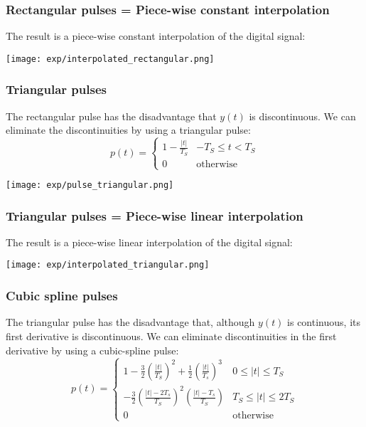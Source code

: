 \documentclass{beamer}
\begin{document}
\begin{frame}
  \frametitle{Rectangular pulses = Piece-wise constant interpolation}

  The result is a  piece-wise constant interpolation of the digital signal:

  \centerline{\texttt{[image: exp/interpolated\_rectangular.png]}}  
\end{frame}

\begin{frame}
  \frametitle{Triangular pulses}

  The rectangular pulse has the disadvantage that $y(t)$ is discontinuous.
  We can eliminate the discontinuities by using a triangular pulse:
  \begin{displaymath}
    p(t) = \begin{cases}
      1-\frac{|t|}{T_S} & -T_S\le t<T_S\\
      0 & \mbox{otherwise}
    \end{cases}
  \end{displaymath}

  \centerline{\texttt{[image: exp/pulse\_triangular.png]}}  
\end{frame}

\begin{frame}
  \frametitle{Triangular pulses = Piece-wise linear interpolation}

  The result is a  piece-wise linear interpolation of the digital signal:

  \centerline{\texttt{[image: exp/interpolated\_triangular.png]}}  
\end{frame}

\begin{frame}
  \frametitle{Cubic spline pulses}

  The triangular pulse has the disadvantage that, although $y(t)$ is continuous, its
  first derivative is discontinuous.  We can eliminate discontinuities in the first derivative
  by using a cubic-spline pulse:
  \begin{displaymath}
    p(t) = \begin{cases}
      1-\frac{3}{2}\left(\frac{|t|}{T_S}\right)^2 +\frac{1}{2}\left(\frac{|t|}{T_s}\right)^3 & 0\le |t|\le T_S\\
      -\frac{3}{2}\left(\frac{|t|-2T_s}{T_S}\right)^2\left(\frac{|t|-T_s}{T_S}\right) & T_S\le |t|\le 2T_S\\
      0 & \mbox{otherwise}
    \end{cases}
  \end{displaymath}

\end{frame}
\end{document}
